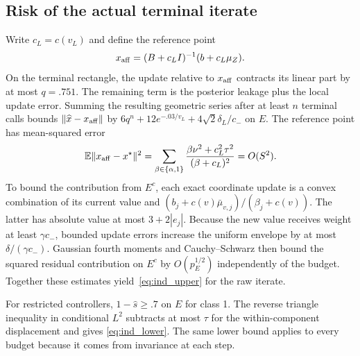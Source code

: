 \subsection{Risk of the actual terminal iterate}
Write $c_L=c(v_L)$ and define the reference point
\[
 x_{\rm aff}=(B+c_L I)^{-1}(b+c_L\mu_Z).
\]
On the terminal rectangle, the update relative to $x_{\rm aff}$
contracts its linear part by at most $q=.751$. The remaining
term is the posterior leakage plus the local update error.
Summing the resulting geometric series after at least $n$ terminal
calls bounds $\lVert\widehat x-x_{\rm aff}\rVert$ by
$6q^n+12e^{-.03/v_L}+4\sqrt{2}\delta_L/c_-$ on $E$.
The reference point has mean-squared error
\[
 \mathbb E\lVert x_{\rm aff}-x^\star\rVert^2=
 \sum_{\beta\in\{\alpha,1\}}
 \frac{\beta\nu^2+c_L^2\tau^2}{(\beta+c_L)^2}=O(S^2).
\]
To bound the contribution from $E^c$, each exact coordinate update
is a convex combination of its current value and
$(b_j+c(v)\bar\mu_{v,j})/(\beta_j+c(v))$.
The latter has absolute value at most $3+2|e_j|$. Because the new
value receives weight at least $\gamma c_-$, bounded update errors
increase the uniform envelope by at most $\delta/(\gamma c_-)$.
Gaussian fourth moments and Cauchy--Schwarz then bound the squared
residual contribution on $E^c$ by $O(p_E^{1/2})$ independently of the
budget. Together these estimates yield~\eqref{eq:ind_upper} for
the raw iterate.

For restricted controllers, $1-\widehat s\ge .7$ on $E$ for class 1.
The reverse triangle inequality in conditional $L^2$ subtracts
at most $\tau$ for the within-component displacement and gives
\eqref{eq:ind_lower}. The same lower bound applies to every budget
because it comes from invariance at each step.
